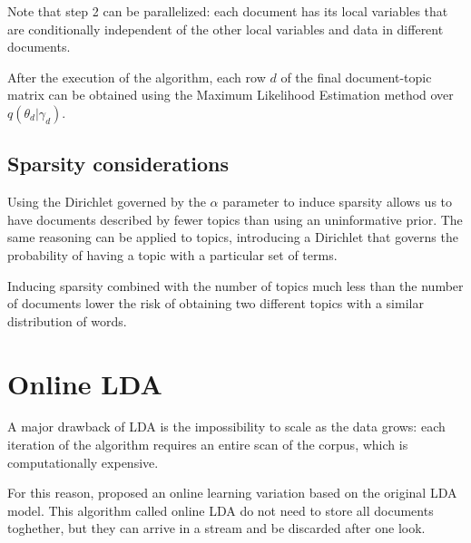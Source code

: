 Note that step 2 can be parallelized: each document has its local variables that are conditionally independent
of the other local variables and data in different documents.

After the execution of the algorithm, each row $d$ of the final document-topic matrix can be obtained using the Maximum Likelihood Estimation method over $q(\theta_d | \gamma_d)$.

\subsection{Sparsity considerations} \label{sparsity_lda}
Using the Dirichlet governed by the $\alpha$ parameter to induce sparsity
allows us to have documents described by fewer topics than using an uninformative prior.
The same reasoning can be applied to topics, introducing a Dirichlet that governs the
probability of having a topic with a particular set of terms.

Inducing sparsity combined with the number of topics much less than the number of documents
lower the risk of obtaining two different topics with a similar distribution of words.


\section{Online LDA}
A major drawback of LDA is the impossibility to scale as the data grows:
each iteration of the algorithm requires an entire scan of the corpus, which is computationally expensive.

For this reason, \cite{NIPS2010_3902} proposed an online learning variation based on the original LDA model.
This algorithm called online LDA do not need to store all documents toghether,
but they can arrive in a stream and be discarded after one look.

